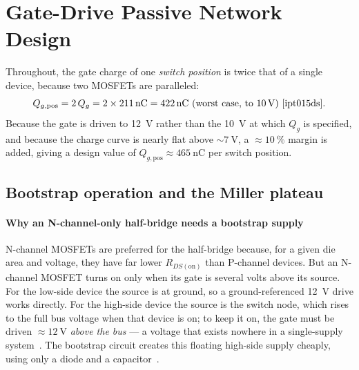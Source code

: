 \documentclass[journal,onecolumn,11pt]{IEEEtran}
\newcommand{\Rdson}{R_{DS(\mathrm{on})}}
\begin{document}
\section{Gate-Drive Passive Network Design}\label{sec:passive}

Throughout, the gate charge of one \emph{switch position} is twice that of a single device, because
two MOSFETs are paralleled:
\begin{equation}
Q_{g,\mathrm{pos}} = 2\,Q_{g} = 2\times\SI{211}{\nano\coulomb} = \SI{422}{\nano\coulomb}\ \text{(worst case, to \SI{10}{\volt})}~\cite{ipt015ds}.
\end{equation}
Because the gate is driven to \SI{12}{\volt} rather than the \SI{10}{\volt} at which $Q_g$ is
specified, and because the charge curve is nearly flat above $\sim\SI{7}{\volt}$, a $\approx\SI{10}{\percent}$
margin is added, giving a design value of $Q_{g,\mathrm{pos}}\approx\SI{465}{\nano\coulomb}$ per
switch position.

\subsection{Bootstrap operation and the Miller plateau}\label{sec:boottheory}
\paragraph{Why an N-channel-only half-bridge needs a bootstrap supply}
N-channel MOSFETs are preferred for the half-bridge because, for a given die area and voltage, they
have far lower $\Rdson$ than P-channel devices. But an N-channel MOSFET turns on only when its gate
is several volts above its source. For the low-side device the source is at ground, so a
ground-referenced \SI{12}{\volt} drive works directly. For the high-side device the source is the
switch node, which rises to the full bus voltage when that device is on; to keep it on, the gate
must be driven $\approx\SI{12}{\volt}$ \emph{above the bus} --- a voltage that exists nowhere in a
single-supply system~\cite{ucc27211,balogh}. The bootstrap circuit creates this floating high-side
supply cheaply, using only a diode and a capacitor~\cite{ir_an978}.
\end{document}
